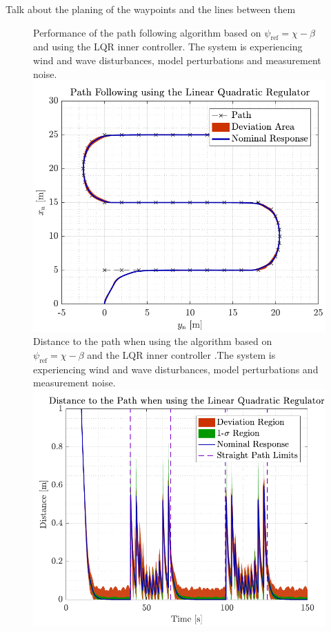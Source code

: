 Talk about the planing of the waypoints and the lines between them
\begin{figure}[H]
    \captionbox  
    {            
        Performance of the path following algorithm based on $\psi_\mathrm{ref}=\chi-\beta$ and using the LQR inner controller. The system is experiencing wind and wave disturbances, model perturbations and measurement noise.            
        \label{fig:path_lqr}                               
    }                                                                
    {                                                                 
        \includegraphics[width=.45\textwidth]{figures/path_lqr}         
    }                                                                  
    \hspace{5pt}                                                        
    \captionbox 
    {       
        Distance to the path when using the algorithm based on $\psi_\mathrm{ref}=\chi-\beta$ and the LQR inner controller .The system is experiencing wind and wave disturbances, model perturbations and measurement noise.                                                                  %
        \label{fig:distlqr2}                                  
    }                                                                          
    {                                                                            
        \includegraphics[width=.45\textwidth]{figures/dist_lqr}          
    }                                                                            
\end{figure}
